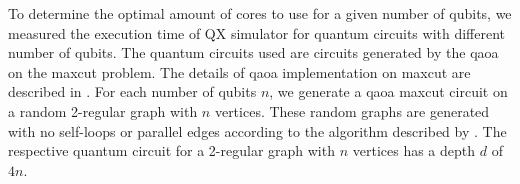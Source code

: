 To determine the optimal amount of cores to use for a given number of qubits, we measured the execution time of QX simulator for quantum circuits with different number of qubits.
The quantum circuits used are circuits generated by the \gls{qaoa} on the \gls{maxcut} problem.
The details of \gls{qaoa} implementation on \gls{maxcut} are described in .
For each number of qubits $n$, we generate a \gls{qaoa} \gls{maxcut} circuit on a random 2-regular graph with $n$ vertices.
These random graphs are generated with no self-loops or parallel edges according to the algorithm described by \textcite{steger1999generating}.
The respective quantum circuit for a 2-regular graph with $n$ vertices has a depth $d$ of $4n$.



